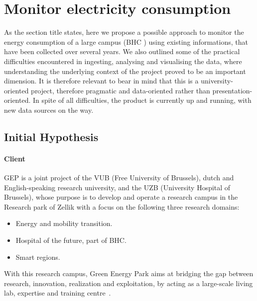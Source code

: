 \section{Monitor electricity consumption}
As the section title states, here we propose a possible approach to monitor the energy consumption of a large campus (\acs{BHC} ) using existing informations, that have been collected over several years.
We also outlined some of the practical difficulties encountered in ingesting, analysing and visualising the data, 
where understanding the underlying context of the project proved to be an important dimension. 
It is therefore relevant to bear in mind that this is a university-oriented project, therefore pragmatic and data-oriented rather than presentation-oriented.
In spite of all difficulties, the product is currently up and running, with new data sources on the way.

\subsection{Initial Hypothesis}\label{sub:vub_initial_hp}
\paragraph{Client} 
\ac{GEP} is a joint project of the \ac{VUB} (Free University of Brussels), dutch and English-speaking research university, and the \ac{UZB} (University Hospital of Brussels), 
whose purpose is to develop and operate a research campus in the Research park of Zellik with a focus on the following three research domains:
\begin{itemize}
    \item Energy and mobility transition.
    \item Hospital of the future, part of \ac{BHC}.
    \item Smart regions.
\end{itemize}
With this research campus, Green Energy Park aims at bridging the gap between research, innovation, realization and exploitation, by acting as a large-scale living lab, expertise and training centre~\cite{Misc:vub_2020_green}.
